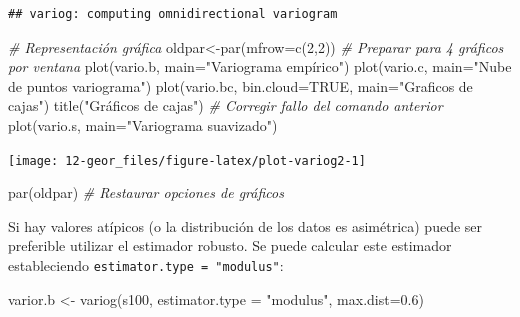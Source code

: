 \documentclass[
  spanish,
]{book}
\newenvironment{Shaded}{\begin{snugshade}}{\end{snugshade}}
\newcommand{\AttributeTok}[1]{\textcolor[rgb]{0.77,0.63,0.00}{#1}}
\newcommand{\CommentTok}[1]{\textcolor[rgb]{0.56,0.35,0.01}{\textit{#1}}}
\newcommand{\ConstantTok}[1]{\textcolor[rgb]{0.00,0.00,0.00}{#1}}
\newcommand{\DecValTok}[1]{\textcolor[rgb]{0.00,0.00,0.81}{#1}}
\newcommand{\FloatTok}[1]{\textcolor[rgb]{0.00,0.00,0.81}{#1}}
\newcommand{\FunctionTok}[1]{\textcolor[rgb]{0.00,0.00,0.00}{#1}}
\newcommand{\NormalTok}[1]{#1}
\newcommand{\OtherTok}[1]{\textcolor[rgb]{0.56,0.35,0.01}{#1}}
\newcommand{\StringTok}[1]{\textcolor[rgb]{0.31,0.60,0.02}{#1}}
\theoremstyle{break}
\begin{document}
\begin{verbatim}
## variog: computing omnidirectional variogram
\end{verbatim}

\begin{Shaded}
\begin{Highlighting}[]
\CommentTok{\# Representación gráfica}
\NormalTok{oldpar}\OtherTok{\textless{}{-}}\FunctionTok{par}\NormalTok{(}\AttributeTok{mfrow=}\FunctionTok{c}\NormalTok{(}\DecValTok{2}\NormalTok{,}\DecValTok{2}\NormalTok{)) }\CommentTok{\# Preparar para 4 gráficos por ventana}
\FunctionTok{plot}\NormalTok{(vario.b, }\AttributeTok{main=}\StringTok{"Variograma empírico"}\NormalTok{)}
\FunctionTok{plot}\NormalTok{(vario.c, }\AttributeTok{main=}\StringTok{"Nube de puntos variograma"}\NormalTok{)}
\FunctionTok{plot}\NormalTok{(vario.bc, }\AttributeTok{bin.cloud=}\ConstantTok{TRUE}\NormalTok{, }\AttributeTok{main=}\StringTok{"Graficos de cajas"}\NormalTok{)}
\FunctionTok{title}\NormalTok{(}\StringTok{"Gráficos de cajas"}\NormalTok{) }\CommentTok{\# Corregir fallo del comando anterior}
\FunctionTok{plot}\NormalTok{(vario.s, }\AttributeTok{main=}\StringTok{"Variograma suavizado"}\NormalTok{)}
\end{Highlighting}
\end{Shaded}

\begin{center}\texttt{[image: 12-geor\_files/figure-latex/plot-variog2-1]} \end{center}

\begin{Shaded}
\begin{Highlighting}[]
\FunctionTok{par}\NormalTok{(oldpar) }\CommentTok{\# Restaurar opciones de gráficos}
\end{Highlighting}
\end{Shaded}

Si hay valores atípicos (o la distribución de los datos es asimétrica)
puede ser preferible utilizar el estimador robusto. Se puede
calcular este estimador estableciendo \texttt{estimator.type\ =\ "modulus"}:

\begin{Shaded}
\begin{Highlighting}[]
\NormalTok{varior.b }\OtherTok{\textless{}{-}} \FunctionTok{variog}\NormalTok{(s100, }\AttributeTok{estimator.type =} \StringTok{"modulus"}\NormalTok{, }\AttributeTok{max.dist=}\FloatTok{0.6}\NormalTok{)}
\end{Highlighting}
\end{Shaded}
\end{document}

